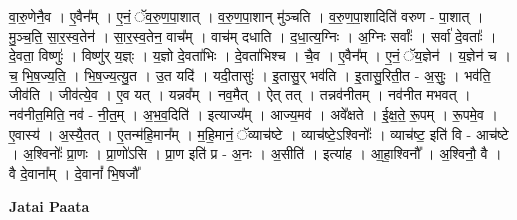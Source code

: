 \documentclass[17pt]{extarticle}
\begin{document}
वा॒रु॒णेनै॒व । ए॒वैन᳚म् । ए॒नं॒ ॅव॒रु॒ण॒पा॒शात् । व॒रु॒ण॒पा॒शान् मु॑ञ्चति । व॒रु॒ण॒पा॒शादिति॑ वरुण - पा॒शात् । मु॒ञ्च॒ति॒ सा॒र॒स्व॒तेन॑ । सा॒र॒स्व॒तेन॒ वाच᳚म् । वाच॑म् दधाति । द॒धा॒त्य॒ग्निः । अ॒ग्निः सर्वाः᳚ । सर्वा॑ दे॒वताः᳚ । दे॒वता॒ विष्णुः॑ । विष्णु॑र् य॒ज्ञ्ः । य॒ज्ञो दे॒वता॑भिः । दे॒वता॑भिश्च । चै॒व । ए॒वैन᳚म् । ए॒नं॒ ॅय॒ज्ञेन॑ । य॒ज्ञेन॑ च । च॒ भि॒॒ष॒ज्य॒ति॒ । भि॒ष॒ज्य॒त्यु॒त । उ॒त यदि॑ । यदी॒तासुः॑ । इ॒तासु॒र् भव॑ति । इ॒तासु॒रिती॒त - अ॒सुः॒ । भव॑ति॒ जीव॑ति । जीव॑त्ये॒व । ए॒व यत् । यन्नव᳚म् । नव॒मैत् । ऐत् तत् । तन्नव॑नीतम् । नव॑नीत मभवत् । नव॑नीत॒मिति॒ नव॑ - नी॒त॒॒म् । अ॒भ॒व॒दिति॑ । इत्याज्य᳚म् । आज्य॒मव॑ । अवे᳚क्षते । ई॒क्ष॒ते॒ रू॒पम् । रू॒पमे॒व । ए॒वास्य॑ । अ॒स्यै॒तत् । ए॒तन्म॑हि॒मान᳚म् । म॒हि॒मानं॒ ॅव्याच॑ष्टे । व्याच॑ष्टे॒ऽश्विनोः᳚ । व्याच॑ष्ट॒ इति॑ वि - आच॑ष्टे । अ॒श्विनोः᳚ प्रा॒णः । प्रा॒णो॑ऽसि । प्रा॒ण इति॑ प्र - अ॒नः । अ॒सीति॑ । इत्या॑ह । आ॒हा॒श्विनौ᳚ । अ॒श्विनौ॒ वै । वै दे॒वाना᳚म् । दे॒वानां᳚ भि॒षजौ᳚ \newline

\textbf{Jatai Paata} \newline
\end{document}
